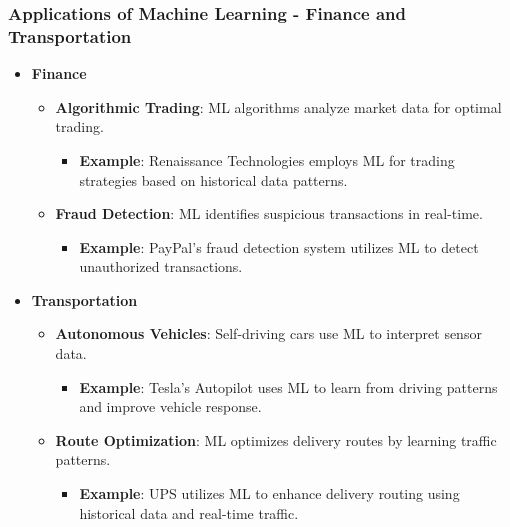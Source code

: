 \documentclass[aspectratio=169]{beamer}
\begin{document}
\begin{frame}[fragile]
    \frametitle{Applications of Machine Learning - Finance and Transportation}
    \begin{itemize}
        \item \textbf{Finance}
        \begin{itemize}
            \item \textbf{Algorithmic Trading}: ML algorithms analyze market data for optimal trading.
            \begin{itemize}
                \item \textbf{Example}: Renaissance Technologies employs ML for trading strategies based on historical data patterns.
            \end{itemize}
            \item \textbf{Fraud Detection}: ML identifies suspicious transactions in real-time.
            \begin{itemize}
                \item \textbf{Example}: PayPal’s fraud detection system utilizes ML to detect unauthorized transactions.
            \end{itemize}
        \end{itemize}
        
        \item \textbf{Transportation}
        \begin{itemize}
            \item \textbf{Autonomous Vehicles}: Self-driving cars use ML to interpret sensor data.
            \begin{itemize}
                \item \textbf{Example}: Tesla's Autopilot uses ML to learn from driving patterns and improve vehicle response.
            \end{itemize}
            \item \textbf{Route Optimization}: ML optimizes delivery routes by learning traffic patterns.
            \begin{itemize}
                \item \textbf{Example}: UPS utilizes ML to enhance delivery routing using historical data and real-time traffic.
            \end{itemize}
        \end{itemize}
    \end{itemize}
\end{frame}
\end{document}
